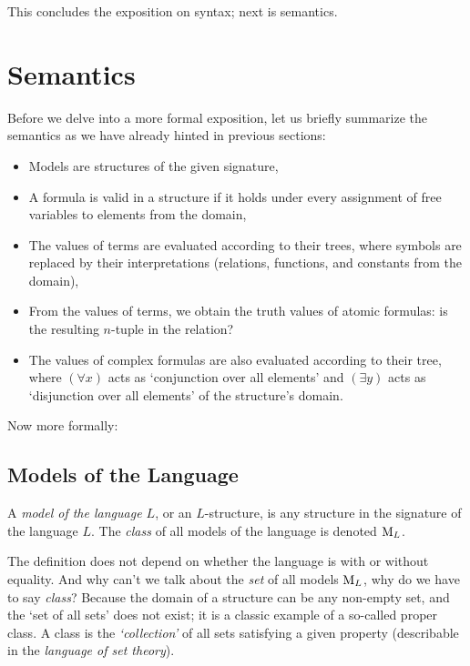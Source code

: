 This concludes the exposition on syntax; next is semantics.


\section{Semantics}\label{section:predicate-semantics}

Before we delve into a more formal exposition, let us briefly summarize the semantics as we have already hinted in previous sections:

\begin{itemize}
    \item Models are structures of the given signature,
    \item A formula is valid in a structure if it holds under every assignment of free variables to elements from the domain,
    \item The values of terms are evaluated according to their trees, where symbols are replaced by their interpretations (relations, functions, and constants from the domain),
    \item From the values of terms, we obtain the truth values of atomic formulas: is the resulting $n$-tuple in the relation?
    \item The values of complex formulas are also evaluated according to their tree, where $(\forall x)$ acts as `conjunction over all elements' and $(\exists y)$ acts as `disjunction over all elements' of the structure's domain.
\end{itemize}

Now more formally:

\subsection{Models of the Language}

\begin{definition}
A \emph{model of the language $L$}, or an $L$-structure, is any structure in the signature of the language $L$. The \emph{class} of all models of the language is denoted $\operatorname{M}_L$.
\end{definition}

\begin{remark}
The definition does not depend on whether the language is with or without equality. And why can't we talk about the \emph{set} of all models $\operatorname{M}_L$, why do we have to say \emph{class}? Because the domain of a structure can be any non-empty set, and the `set of all sets' does not exist; it is a classic example of a so-called proper class. A class is the \emph{`collection'} of all sets satisfying a given property (describable in the \emph{language of set theory}).
\end{remark}


